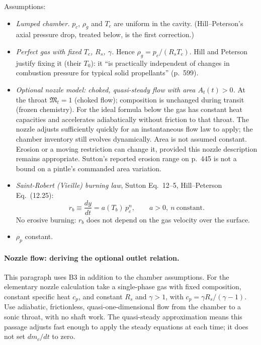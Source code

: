 Assumptions:
\begin{itemize}
\item[B1] \emph{Lumped chamber.} $p_c$, $\rho_g$ and $T_c$ are uniform in the
cavity. (Hill--Peterson's axial pressure drop, treated below, is the first
correction.)
\item[B2] \emph{Perfect gas with fixed $T_c$, $R_s$, $\gamma$.} Hence
$\rho_g=p_c/(R_sT_c)$. Hill and Peterson justify fixing it (their $T_0$): it ``is
practically independent of changes in combustion pressure for typical solid
propellants'' (p.~599).
\item[B3] \emph{Optional nozzle model: choked, quasi-steady flow with area $A_t(t)>0$.}
At the throat $\mathfrak M_t=1$ (choked flow); composition is unchanged during
transit (frozen chemistry). For the ideal formula below the gas has
constant heat capacities and accelerates adiabatically without friction
to that throat. The nozzle adjusts sufficiently quickly for an instantaneous
flow law to apply; the chamber inventory still evolves dynamically. Area is not
assumed constant. Erosion or a moving restriction can change it, provided
this nozzle description remains appropriate. Sutton's reported erosion
range on p.~445 is not a bound on a pintle's commanded area variation.
\item[B4] \emph{Saint-Robert (Vieille) burning law}, Sutton Eq.~12--5,
Hill--Peterson Eq.~(12.25):
\begin{equation}\label{eq:sb-burn-law}
 r_b\equiv\frac{dy}{dt}=a(T_b)\,p_c^n,\qquad a>0,\ n\ \text{constant}.
\end{equation}
No erosive burning: $r_b$ does not depend on the gas velocity over the surface.
\item[B5] $\rho_p$ constant.
\end{itemize}

\paragraph{Nozzle flow: deriving the optional outlet relation.}
This paragraph uses B3 in addition to the chamber assumptions.
For the elementary nozzle calculation take a single-phase gas with
fixed composition, constant specific heat $c_p$, and constant $R_s$ and
$\gamma>1$, with
$c_p=\gamma R_s/(\gamma-1)$. Use adiabatic, frictionless,
quasi-one-dimensional flow from the chamber to a sonic throat, with
no shaft work. The quasi-steady approximation means this passage
adjusts fast enough to apply the steady equations at each time;
it does not set $dm_c/dt$ to zero.

